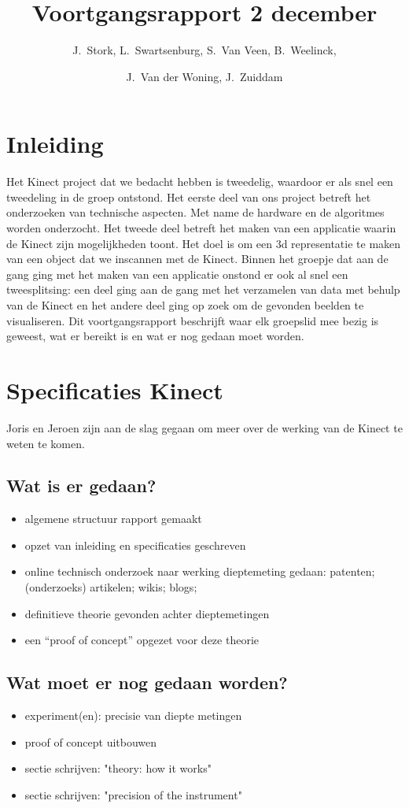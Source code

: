 \documentclass[10pt,a4paper]{article}
\author{
  J.\ Stork, L.\ Swartsenburg,  S.\ Van Veen, B.\ Weelinck,\and J.\ Van der Woning, J.\ Zuiddam 
} %
\title{Voortgangsrapport 2 december}
\begin{document}
\maketitle
\tableofcontents
\section{Inleiding}
Het Kinect project dat we bedacht hebben is tweedelig, waardoor er als snel een tweedeling in de groep ontstond. Het eerste deel van ons project betreft het onderzoeken van technische aspecten. Met name de hardware en de algoritmes worden onderzocht. Het tweede deel betreft het maken van een applicatie waarin de Kinect zijn mogelijkheden toont. Het doel is om een 3d representatie te maken van een object dat we inscannen met de Kinect. Binnen het groepje dat aan de gang ging met het maken van een applicatie onstond er ook al snel een tweesplitsing: een deel ging aan de gang met het verzamelen van data met behulp van de Kinect en het andere deel ging op zoek om de gevonden beelden te visualiseren. Dit voortgangsrapport beschrijft waar elk groepslid mee bezig is geweest, wat er bereikt is en wat er nog gedaan moet worden. 

\section{Specificaties Kinect}
Joris en Jeroen zijn aan de slag gegaan om meer over de werking van de Kinect te weten te komen. 

\subsection{Wat is er gedaan?}
\begin{itemize}
\item algemene structuur rapport gemaakt
\item opzet van inleiding en specificaties geschreven
\item online technisch onderzoek naar werking dieptemeting gedaan: patenten; (onderzoeks) artikelen; wikis; blogs;
\item definitieve theorie gevonden achter dieptemetingen
\item een ``proof of concept'' opgezet voor deze theorie
\end{itemize}
\subsection{Wat moet er nog gedaan worden?}
\begin{itemize}
\item experiment(en): precisie van diepte metingen
\item proof of concept uitbouwen
\item sectie schrijven: "theory: how it works"
\item sectie schrijven: "precision of the instrument"
\end{itemize}
\end{document}
